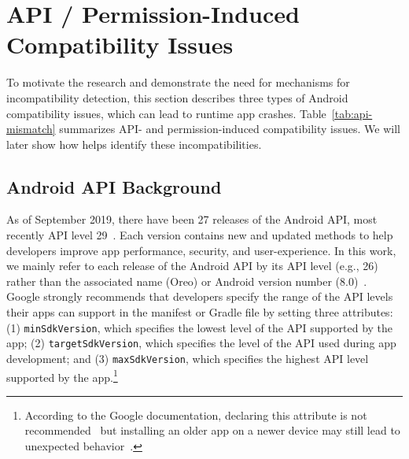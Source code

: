 


\section{API / Permission-Induced Compatibility Issues}\label{sec-background}

To motivate the research and demonstrate the need for
mechanisms for incompatibility detection, this section
describes three types of Android compatibility issues,
which can lead to runtime app crashes.
Table~\ref{tab:api-mismatch} summarizes API- and
permission-induced compatibility issues.  We will later
show how \@approach helps identify these
incompatibilities.




\subsection{Android API Background}

As of September 2019, there have been 27 releases of the Android API, most recently
API level 29~\cite{android10}.  Each version contains new and
updated methods to help developers improve app performance, security,
and user-experience. In this work, we mainly refer to each release of
the Android API by its API level (e.g., 26) rather than the associated name 
(Oreo) or Android version number (8.0)~\cite{androidversions}. 
Google strongly recommends that developers specify the range of the API levels
their apps can support in the manifest or Gradle file by setting
three attributes: (1) {\tt minSdkVersion}, which specifies the lowest level of the API supported by the app; (2) {\tt targetSdkVersion}, which specifies the level of the API used during app development; and (3) {\tt maxSdkVersion}, which specifies the highest API level supported by the app.\footnote{According to the Google documentation, declaring this attribute is not
    recommended~\cite{sdkversions} but installing an older app on a newer device
    may still lead to unexpected behavior~\cite{Update4}.}

